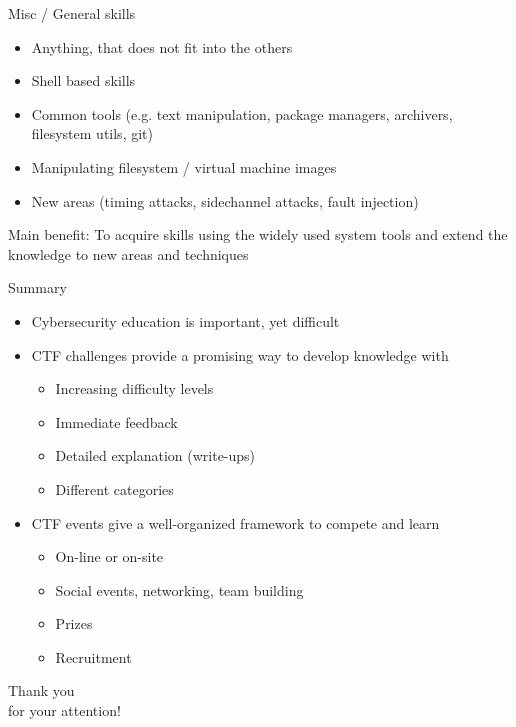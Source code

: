 \documentclass[12 pt]{beamer}
\begin{document}
\begin{frame}{Misc / General skills}

  \begin{itemize}
    \item{Anything, that does not fit into the others}
    \item{Shell based skills}
    \item{Common tools (e.g. text manipulation, package managers, archivers, filesystem utils, git)}
    \item{Manipulating filesystem / virtual machine images}
    \item{New areas (timing attacks, sidechannel attacks, fault injection)}
  \end{itemize}

  \begin{exampleblock}{}
    Main benefit: To acquire skills using the widely used system tools and extend the knowledge to new areas and techniques
  \end{exampleblock}

\end{frame}


\begin{frame}{Summary}

  \begin{itemize}
    \item{Cybersecurity education is important, yet difficult}
    \item{CTF challenges provide a promising way to develop knowledge with}
      \begin{itemize}
        \item{Increasing difficulty levels}
        \item{Immediate feedback}
        \item{Detailed explanation (write-ups)}
        \item{Different categories}
      \end{itemize}
    \item{CTF events give a well-organized framework to compete and learn}
      \begin{itemize}
        \item{On-line or on-site}
        \item{Social events, networking, team building}
        \item{Prizes}
        \item{Recruitment}
      \end{itemize}
  \end{itemize}

\end{frame}


\begin{frame}{}

  \centering
  \Huge
  Thank you\\
  for your attention!

\end{frame}

\end{document}
